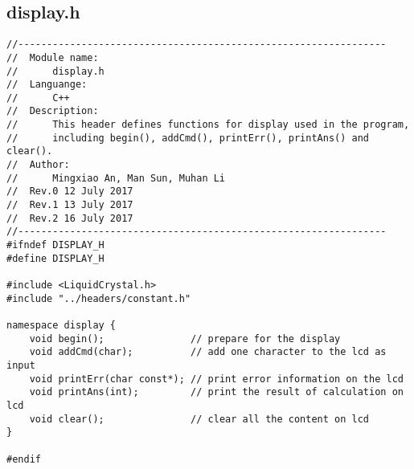 \subsection{display.h}
\begin{verbatim}
//----------------------------------------------------------------
//  Module name:
//      display.h
//  Languange:
//      C++
//  Description:
//      This header defines functions for display used in the program,
//      including begin(), addCmd(), printErr(), printAns() and clear().
//  Author:
//      Mingxiao An, Man Sun, Muhan Li
//  Rev.0 12 July 2017
//  Rev.1 13 July 2017
//  Rev.2 16 July 2017
//----------------------------------------------------------------
#ifndef DISPLAY_H
#define DISPLAY_H

#include <LiquidCrystal.h>
#include "../headers/constant.h"

namespace display {
    void begin();               // prepare for the display
    void addCmd(char);          // add one character to the lcd as input 
    void printErr(char const*); // print error information on the lcd
    void printAns(int);         // print the result of calculation on lcd 
    void clear();               // clear all the content on lcd 
}

#endif

\end{verbatim}


